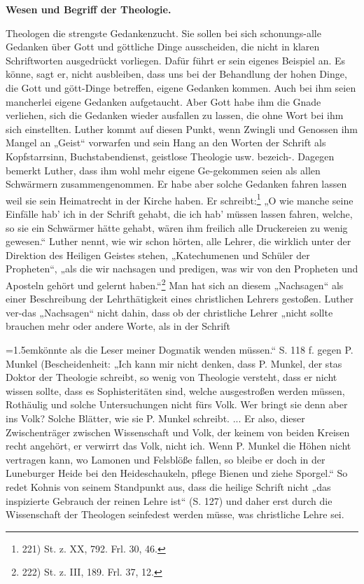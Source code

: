 \textbf{Wesen und Begriff der Theologie. }

Theologen die strengste Gedankenzucht. Sie sollen bei sich schonungs-\los alle Gedanken über Gott und göttliche Dinge ausscheiden, die nicht in klaren Schriftworten ausgedrückt vorliegen. Dafür führt er sein eigenes Beispiel an. Es könne, sagt er, nicht ausbleiben, dass uns bei der Behandlung der hohen Dinge, die Gott und gött-\liche Dinge betreffen, eigene Gedanken kommen. Auch bei ihm seien mancherlei eigene Gedanken aufgetaucht. Aber Gott habe ihm die Gnade verliehen, sich die Gedanken wieder ausfallen zu lassen, die ohne Wort bei ihm sich einstellten. Luther kommt auf diesen Punkt, wenn Zwingli und Genossen ihm Mangel an „Geist“ vorwarfen und sein Hang an den Worten der Schrift als Kopfstarrsinn, Buchstabendienst, geistlose Theologie usw. bezeich-\neten. Dagegen bemerkt Luther, dass ihm wohl mehr eigene Ge-\danken gekommen seien als allen Schwärmern zusammengenommen. Er habe aber solche Gedanken fahren lassen weil sie sein Heimatrecht in der Kirche haben. Er schreibt:\footnote{221) St. z. XX, 792. Frl. 30, 46.} „O wie manche seine Einfälle hab’ ich in der Schrift gehabt, die ich hab’ müssen lassen fahren, welche, so sie ein Schwärmer hätte gehabt, wären ihm freilich alle Druckereien zu wenig gewesen.“ Luther nennt, wie wir schon hörten, alle Lehrer, die wirklich unter der Direktion des Heiligen Geistes stehen, „Katechumenen und Schüler der Propheten“, „als die wir nachsagen und predigen, was wir von den Propheten und Aposteln gehört und gelernt haben.“\footnote{222) St. z. III, 189. Frl. 37, 12.} Man hat sich an diesem „Nachsagen“ als einer Beschreibung der Lehrthätigkeit eines christlichen Lehrers gestoßen. Luther ver-\steht das „Nachsagen“ nicht dahin, dass ob der christliche Lehrer „nicht sollte brauchen mehr oder andere Worte, als in der Schrift

\par\noindent\hangindent=1.5em\small könnte als die Leser meiner Dogmatik wenden müssen.“ S. 118 f. gegen P. Munkel (Bescheidenheit: „Ich kann mir nicht denken, dass P. Munkel, der stas Doktor der Theologie schreibt, so wenig von Theologie versteht, dass er nicht wissen sollte, dass es Sophisteritäten sind, welche ausgestroßen werden müssen, Rothäulig und solche Untersuchungen nicht fürs Volk. Wer bringt sie denn aber ins Volk? Solche Blätter, wie sie P. Munkel schreibt. ... Er also, dieser Zwischenträger zwischen Wissenschaft und Volk, der keinem von beiden Kreisen recht angehört, er verwirrt das Volk, nicht ich. Wenn P. Munkel die Höhen nicht vertragen kann, wo Lamonen und Felsblöße fallen, so bleibe er doch in der Luneburger Heide bei den Heideschaukeln, pflege Bienen und ziehe Sporgel.“ So redet Kohnis von seinem Standpunkt aus, dass die heilige Schrift nicht „das inspizierte Gebrauch der reinen Lehre ist“ (S. 127) und daher erst durch die Wissenschaft der Theologen seinfedest werden müsse, was christliche Lehre sei.

